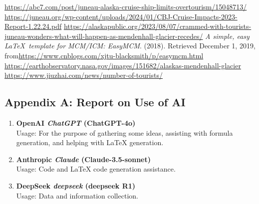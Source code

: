 \documentclass[12pt]{article}  %
\begin{document}
\clearpage


\begin{thebibliography}{99}
 \url{https://abc7.com/post/juneau-alaska-cruise-ship-limits-overtourism/15048713/}
 \url{https://juneau.org/wp-content/uploads/2024/01/CBJ-Cruise-Impacts-2023-Report-1.22.24.pdf}
 \url{https://alaskapublic.org/2023/08/07/crammed-with-tourists-juneau-wonders-what-will-happen-as-mendenhall-glacier-recedes/}
 \emph{A simple, easy \LaTeX\ template for MCM/ICM: EasyMCM}. (2018). Retrieved December 1, 2019, from\url{https://www.cnblogs.com/xjtu-blacksmith/p/easymcm.html}
 \url{https://earthobservatory.nasa.gov/images/151682/alaskas-mendenhall-glacier}
 \url{https://www.jiuzhai.com/news/number-of-tourists/}
\end{thebibliography}


\begin{subappendices}  %

\section{Appendix A: Report on Use of AI}
\begin{enumerate}
	\item \textbf{OpenAI \textit{ChatGPT} (ChatGPT-4o)}\\
	Usage: For the purpose of gathering some ideas, assisting with formula generation, and helping with LaTeX generation.
	
	\item \textbf{Anthropic \textit{Claude} (Claude-3.5-sonnet)}\\
	Usage: Code and LaTeX code generation assistance.
	
	\item \textbf{DeepSeek \textit{deepseek} (deepseek R1)}\\
	Usage: Data and information collection.
\end{enumerate}
\end{subappendices}  %
\end{document}
